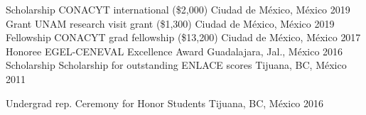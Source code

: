 \vspace{-5mm}
\begin{minipage}[t]{0.5\textwidth}
\begin{center}
\begin{cvhonors}
    \cvhonor
    {Scholarship}
    {CONACYT \textendash{} international (\approx\$2,000)}
    {Ciudad de México, México}
    {2019}
    \cvhonor
    {Grant}
    {UNAM research visit grant (\approx\$1,300)}
    {Ciudad de México, México}
    {2019}
    \cvhonor
    {Fellowship}
    {CONACYT grad fellowship (\approx\$13,200)}
    {Ciudad de México, México}
    {2017}
  \cvhonor
    {Honoree}
    {EGEL-CENEVAL Excellence Award}
    {Guadalajara, Jal., México}
    {2016}
  \cvhonor
    {Scholarship}
    {Scholarship for outstanding ENLACE scores}
    {Tijuana, BC, México}
    {2011}
\end{cvhonors}
\end{center}
\end{minipage}
\begin{minipage}[t]{0.5\textwidth}
\begin{center}
\begin{cvhonors}
  \cvhonor
    {Undergrad rep.}
    {Ceremony for Honor Students}
    {Tijuana, BC, México}
    {2016}
\end{cvhonors}
\end{center}
\end{minipage}
